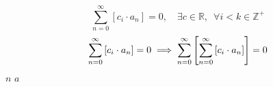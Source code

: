 \documentclass{article}
\begin{document}
$$
\sum^{\infty}_{n= 0}   \left[ c_i \cdot  a_n \right] = 0, \quad \exists c \in
\mathbb{R}, \enspace \forall i<k\in\mathbb{Z}^+
$$
$$
\sum^{\infty}_{n= 0}   \left[ c_i \cdot  a_n \right] = 0\\
\implies \sum^{\infty}_{n= 0}   \left[\sum^{\infty}_{n= 0}   \left[ c_i \cdot
a_n  \right]   \right] = 0
$$
$n$
$a$
\end{document}
